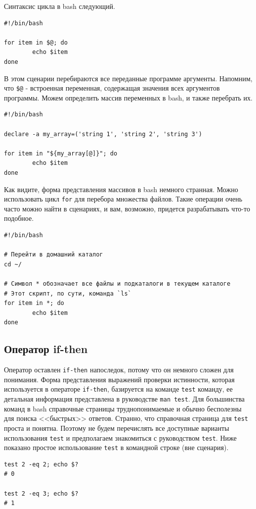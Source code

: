 \documentclass[a4paper,12pt,final,openany]{extbook}
\begin{document}
Синтаксис цикла в bash следующий.
\begin{verbatim}
#!/bin/bash

for item in $@; do
        echo $item
done
\end{verbatim}
В этом сценарии перебираются все переданные программе аргументы.
Напомним, что \texttt{\$@} - встроенная переменная, содержащая значения
всех аргументов программы. Можем определить массив переменных в bash, и
также перебрать их.
\begin{verbatim}
#!/bin/bash

declare -a my_array=('string 1', 'string 2', 'string 3')

for item in "${my_array[@]}"; do
        echo $item
done
\end{verbatim}
Как видите, форма представления массивов в bash немного странная. Можно
использовать цикл \texttt{for} для перебора множества файлов. Такие операции
очень часто можно найти в сценариях, и вам, возможно, придется
разрабатывать что-то подобное.
\begin{verbatim}
#!/bin/bash

# Перейти в домашний каталог
cd ~/

# Символ * обозначает все файлы и подкаталоги в текущем каталоге
# Этот скрипт, по сути, команда `ls`
for item in *; do
        echo $item
done
\end{verbatim}

\hypertarget{if-then-statements}{%
\subsection{\texorpdfstring{\protect\hyperlink{if-then-statements}{}Оператор
if-then}{Оператор if-then}}\label{if-then-statements}}

Оператор оставлен \texttt{if-then} напоследок, потому что он немного сложен
для понимания. Форма представления выражений проверки истинности, которая
используется в операторе \texttt{if-then}, базируется на команде \texttt{test}
команду, ее детальная информация представлена в руководстве
\texttt{man\ test}. Для большинства команд в bash справочные страницы
труднопонимаемые и обычно бесполезны для поиска <<быстрых>> ответов.
Странно, что справочная страница для \texttt{test} проста и понятна.
Поэтому не будем перечислять все доступные варианты использования
\texttt{test} и предполагаем знакомиться с руководством \texttt{test}. Ниже
показано простое использование \texttt{test} в командной строке (вне
сценария).
\begin{verbatim}
test 2 -eq 2; echo $?
# 0

test 2 -eq 3; echo $?
# 1
\end{verbatim}
\end{document}
